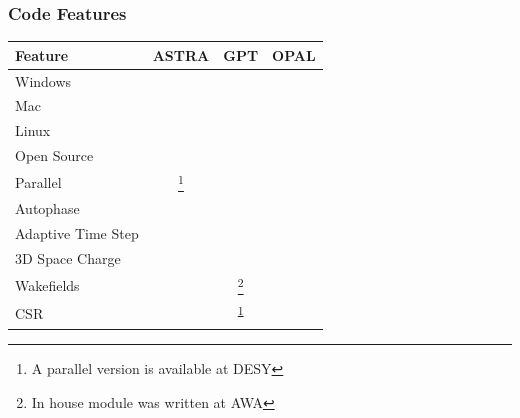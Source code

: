 \documentclass{beamer}
\newcommand{\cmark}{\ding{51}}%
\newcommand{\xmark}{\ding{55}}%
\begin{document}
\begin{frame}
	\frametitle{Code Features}
	\begin{table}
		\begin{minipage}{\textwidth}
			\begin{center}
			\setcounter{mpfootnote}{\value{footnote}}%
			\renewcommand{\thempfootnote}{\arabic{mpfootnote}}%
		\begin{tabular}{l c c c}
			\toprule
			\textbf{Feature} & \textbf{ASTRA} & \textbf{GPT} & \textbf{OPAL}\\
			\midrule
			Windows     		& \cmark & \cmark & \xmark \\ 
			Mac         		& \cmark & \cmark & \cmark \\
			Linux       		& \cmark & \cmark & \cmark \\
			Open Source 		& \xmark & \alert \xmark & \color{black!30!green}\cmark \\
			Parallel    		& \alert \xmark\footnote[1]{A parallel version is available at DESY} & \alert \xmark & \color{black!30!green}\cmark \\
			Autophase   		& \cmark & \xmark & \cmark \\
			Adaptive Time Step 	& \xmark & \cmark & \xmark \\
			3D Space Charge 	& \cmark & \cmark & \cmark \\
			Wakefields  		& \cmark & \xmark\footnote[2]{In house module was written at AWA\label{note2}} & \color{black!30!green}\cmark \\
			CSR         		& \alert \xmark & \xmark\textsuperscript{\ref{note2}} & \color{black!30!green}\cmark \\
			\bottomrule
		\end{tabular}
	\end{center}
	\end{minipage}
\end{table}

\end{frame}
\end{document}
